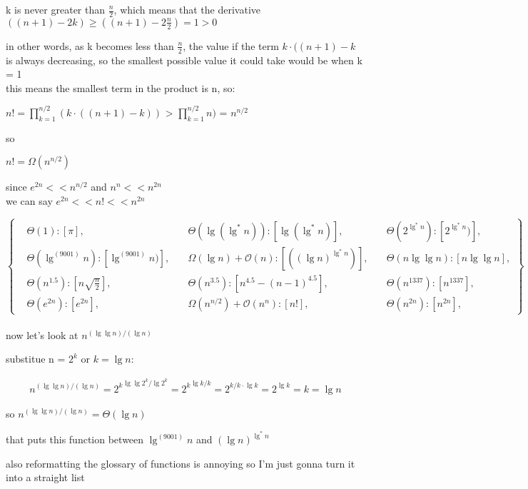 \documentclass[11pt,fleqn]{article}
\theoremstyle{definition}
\theoremstyle{remark}
\begin{document}
k is never greater than $\frac{n}{2}$, which means that
the derivative $((n + 1) - 2k) \geq ((n + 1) - 2\frac{n}{2}) = 1 > 0$ 

in other words, as k becomes less than $\frac{n}{2}$, the value
if the term $k \cdot ((n + 1) - k$ is always decreasing, so the smallest
possible value it could take would be when k = 1\\

this means the smallest term in the product is n, so:

$n! = \prod_{k=1}^{n/2} (k \cdot ((n + 1) - k))$ >
$\prod_{k=1}^{n/2} n)$ = $n^{n/2}$

so 

$n! = \Omega(n^{n/2})$

since $e^{2n} << n^{n/2}$ and $n^n << n^{2n}$\\

we can say $e^{2n} << n! << n^{2n}$

\[
\left\{
\begin{aligned}
& \Theta(1): [\pi],
& \quad \Theta(\lg(\lg^*n)): [\lg(\lg^*n)],
& \quad \Theta(2^{\lg^*n}): [2^{\lg^*n})],\\
& \Theta(\lg^{(9001)} n): [\lg^{(9001)} n)],
& \quad \Omega(\lg n) + \mathcal{O}(n): [({(\lg n)}^{\lg^*{n}})],
& \quad \Theta(n\lg \lg n): [n\lg \lg n],\\
& \Theta(n^{1.5}): [n\sqrt{\frac{n}{2}}],
& \quad \Theta(n^{3.5}): [n^{4.5} - (n - 1)^{4.5}], 
& \quad \Theta(n^{1337}): [n^{1337}],\\
& \Theta(e^{2n}): [e^{2n}],
& \quad \Omega(n^{n/2}) + \mathcal{O}(n^n): [n!],
& \quad \Theta(n^{2n}): [n^{2n}],
\end{aligned}
\right\}
\]\\

now let's look at $n^{({\lg \lg n})/({\lg n})}$

substitue n = $2^k$ or $k = \lg n$:

\begin{align*}
n^{({\lg \lg n})/({\lg n})} =
{2^k}^{{\lg \lg {2^k}} / \lg {2^k}}=
{2^k}^{{\lg k} / k} = 
2^{{k/k} \cdot \lg k} = 
2^{\lg k} =
k =
\lg n
\end{align*}

so $n^{({\lg \lg n})/({\lg n})} = \Theta(\lg n)$

that puts this function between $\lg^{(9001)} n$ and ${(\lg n)}^{\lg^*{n}}$

also reformatting the glossary of functions is annoying so I'm just gonna turn
it into a straight list
\end{document}
